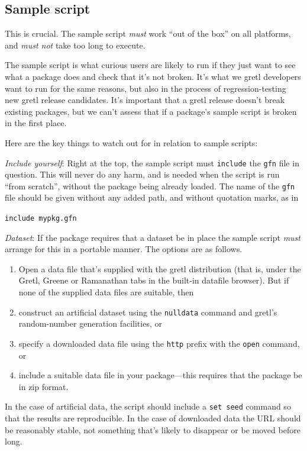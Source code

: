 \documentclass[oneside]{book}
\begin{document}
\subsection{Sample script}
\label{sec:common-sample}

This is crucial. The sample script \textit{must} work ``out of the
box'' on all platforms, and \textit{must not} take too long to
execute.

The sample script is what curious users are likely to run if they just
want to see what a package does and check that it's not broken. It's
what we gretl developers want to run for the same reasons, but also in
the process of regression-testing new gretl release candidates. It's
important that a gretl release doesn't break existing packages,
but we can't assess that if a package's sample script is broken in the
first place.

Here are the key things to watch out for in relation to sample
scripts:

\vspace{1ex}
\textit{Include yourself}: Right at the top, the sample script
  must \texttt{include} the \texttt{gfn} file in question. This will
  never do any harm, and is needed when the script is run ``from
  scratch'', without the package being already loaded.  The name of
  the \texttt{gfn} file should be given without any added path, and
  without quotation marks, as in

  \texttt{include mypkg.gfn}

\vspace{1ex}
\textit{Dataset}: If the package requires that a dataset be in
  place the sample script \textit{must} arrange for this in a portable
  manner. The options are as follows.
 \begin{enumerate}
 \item Open a data file that's supplied with the gretl distribution
   (that is, under the \textsf{Gretl}, \textsf{Greene} or
   \textsf{Ramanathan} tabs in the built-in datafile browser).
   But if none of the supplied data files are suitable, then
 \item construct an artificial dataset using the \texttt{nulldata}
   command and gretl's random-number generation facilities, or
 \item specify a downloaded data file using the \texttt{http} prefix
   with the \texttt{open} command, or
 \item include a suitable data file in your package---this requires
   that the package be in zip format.
 \end{enumerate}
 In the case of artificial data, the script should include a
 \texttt{set seed} command so that the results are reproducible. In
 the case of downloaded data the URL should be reasonably stable, not
 something that's likely to disappear or be moved before long.
\end{document}
